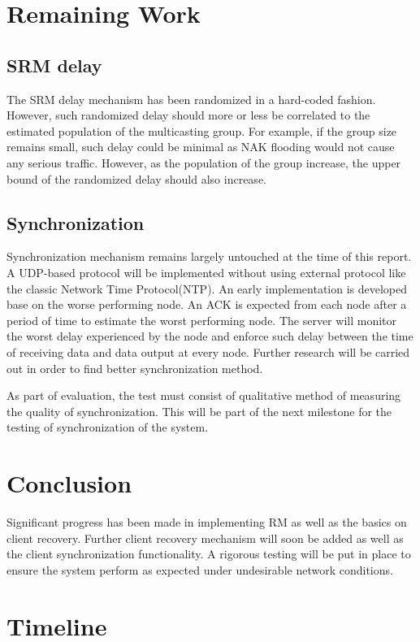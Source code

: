 \documentclass[12pt]{article}
\begin{document}
\section{Remaining Work}

\subsection{SRM delay}
The SRM delay mechanism has been randomized in a hard-coded fashion. However, such randomized delay should more or less be correlated to the estimated population of the multicasting group. For example, if the group size remains small, such delay could be minimal as NAK flooding would not cause any serious traffic. However, as the population of the group increase, the upper bound of the randomized delay should also increase.


\subsection{Synchronization}
Synchronization mechanism remains largely untouched at the time of this report. A UDP-based protocol will be implemented without using external protocol like the classic Network Time Protocol(NTP). An early implementation is developed base on the worse performing node. An ACK is expected from each node after a period of time to estimate the worst performing node. The server will monitor the worst delay experienced by the node and enforce such delay between the time of receiving data and data output at every node. Further research will be carried out in order to find better synchronization method.

As part of evaluation, the test must consist of qualitative method of measuring the quality of synchronization. This will be part of the next milestone for the testing of synchronization of the system.


\section{Conclusion}
Significant progress has been made in implementing RM as well as the basics on client recovery. Further client recovery mechanism will soon be added as well as the client synchronization functionality. A rigorous testing will be put in place to ensure the system perform as expected under undesirable network conditions. 

\pagebreak
\section{Timeline}\label{Timeline}
\end{document}
